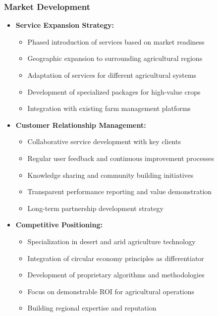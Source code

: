 \subsubsection{Market Development}
\begin{itemize}
    \item \textbf{Service Expansion Strategy:}
    \begin{itemize}
        \item Phased introduction of services based on market readiness
        \item Geographic expansion to surrounding agricultural regions
        \item Adaptation of services for different agricultural systems
        \item Development of specialized packages for high-value crops
        \item Integration with existing farm management platforms
    \end{itemize}
    
    \item \textbf{Customer Relationship Management:}
    \begin{itemize}
        \item Collaborative service development with key clients
        \item Regular user feedback and continuous improvement processes
        \item Knowledge sharing and community building initiatives
        \item Transparent performance reporting and value demonstration
        \item Long-term partnership development strategy
    \end{itemize}
    
    \item \textbf{Competitive Positioning:}
    \begin{itemize}
        \item Specialization in desert and arid agriculture technology
        \item Integration of circular economy principles as differentiator
        \item Development of proprietary algorithms and methodologies
        \item Focus on demonstrable ROI for agricultural operations
        \item Building regional expertise and reputation
    \end{itemize}
\end{itemize}

